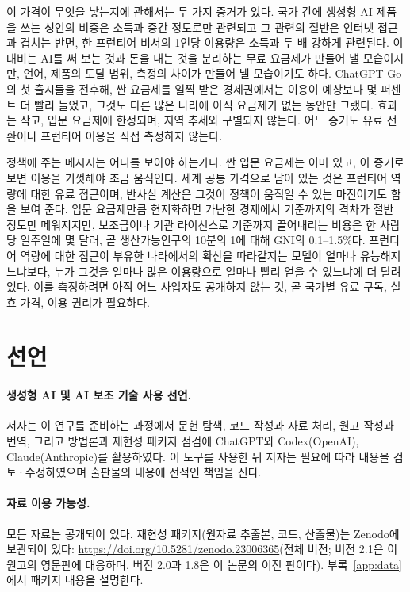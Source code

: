 \documentclass[11pt]{article}
\theoremstyle{definition}
\theoremstyle{remark}
\begin{document}
이 가격이 무엇을 낳는지에 관해서는 두 가지 증거가 있다. 국가 간에 생성형 AI 제품을 쓰는 성인의 비중은 소득과 중간 정도로만 관련되고 그 관련의 절반은 인터넷 접근과 겹치는 반면, 한 프런티어 비서의 1인당 이용량은 소득과 두 배 강하게 관련된다. 이 대비는 AI를 써 보는 것과 돈을 내는 것을 분리하는 무료 요금제가 만들어 낼 모습이지만, 언어, 제품의 도달 범위, 측정의 차이가 만들어 낼 모습이기도 하다. ChatGPT Go의 첫 출시들을 전후해, 싼 요금제를 일찍 받은 경제권에서는 이용이 예상보다 몇 퍼센트 더 빨리 늘었고, 그것도 다른 많은 나라에 아직 요금제가 없는 동안만 그랬다. 효과는 작고, 입문 요금제에 한정되며, 지역 추세와 구별되지 않는다. 어느 증거도 유료 전환이나 프런티어 이용을 직접 측정하지 않는다.

정책에 주는 메시지는 어디를 보아야 하는가다. 싼 입문 요금제는 이미 있고, 이 증거로 보면 이용을 기껏해야 조금 움직인다. 세계 공통 가격으로 남아 있는 것은 프런티어 역량에 대한 유료 접근이며, 반사실 계산은 그것이 정책이 움직일 수 있는 마진이기도 함을 보여 준다. 입문 요금제만큼 현지화하면 가난한 경제에서 기준까지의 격차가 절반 정도만 메워지지만, 보조금이나 기관 라이선스로 기준까지 끌어내리는 비용은 한 사람당 일주일에 몇 달러, 곧 생산가능인구의 10분의 1에 대해 GNI의 0.1--1.5\%다. 프런티어 역량에 대한 접근이 부유한 나라에서의 확산을 따라갈지는 모델이 얼마나 유능해지느냐보다, 누가 그것을 얼마나 많은 이용량으로 얼마나 빨리 얻을 수 있느냐에 더 달려 있다. 이를 측정하려면 아직 어느 사업자도 공개하지 않는 것, 곧 국가별 유료 구독, 실효 가격, 이용 권리가 필요하다.

\section*{선언}
\paragraph{생성형 AI 및 AI 보조 기술 사용 선언.} 저자는 이 연구를 준비하는 과정에서 문헌 탐색, 코드 작성과 자료 처리, 원고 작성과 번역, 그리고 방법론과 재현성 패키지 점검에 ChatGPT와 Codex(OpenAI), Claude(Anthropic)를 활용하였다. 이 도구를 사용한 뒤 저자는 필요에 따라 내용을 검토·수정하였으며 출판물의 내용에 전적인 책임을 진다.
\paragraph{자료 이용 가능성.} 모든 자료는 공개되어 있다. 재현성 패키지(원자료 추출본, 코드, 산출물)는 Zenodo에 보관되어 있다: \href{https://doi.org/10.5281/zenodo.23006365}{https://doi.org/10.5281/zenodo.23006365}(전체 버전; 버전 2.1은 이 원고의 영문판에 대응하며, 버전 2.0과 1.8은 이 논문의 이전 판이다). 부록~\ref{app:data}에서 패키지 내용을 설명한다.
\end{document}

